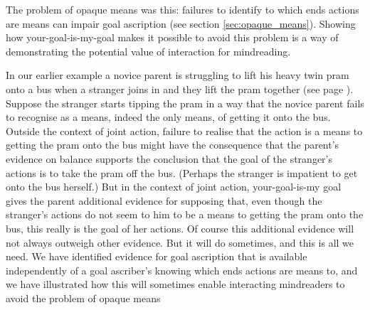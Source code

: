 \documentclass[12pt,\papersize]{extarticle}
\begin{document}
The problem of opaque means was this:
 failures to identify to which ends actions are means can impair goal ascription (see section \vref{sec:opaque_means}).
Showing how your-goal-is-my-goal makes it possible to avoid this problem is a way of demonstrating the potential value   of interaction for mindreading. 

In our earlier example 
a novice parent is struggling to lift his heavy twin pram onto a bus when a stranger joins in and they lift the pram together (see page \pageref*{twin_pram}).
Suppose the stranger starts tipping the pram in a way that the novice parent fails to recognise as a means, indeed the only means, of getting it onto the bus.
Outside the context of joint action, 
failure to realise that the action is a means to getting the pram onto the bus
might have the consequence that
the parent's evidence on balance supports the conclusion that the goal of the stranger's actions is to take the pram off the bus.
(Perhaps the stranger is impatient to get onto the bus herself.)
But in the context of joint action,
your-goal-is-my goal gives the parent  additional evidence for supposing that, 
even though the stranger's actions do not seem to him to be a means to getting the pram onto the bus, 
this really is the goal of her actions.
Of course this additional evidence will not always outweigh   other evidence.
But it will do sometimes, and this is all we need.
We have identified evidence for goal ascription that is available independently of a goal ascriber's knowing which ends actions are means to, and we have illustrated how this will sometimes enable interacting mindreaders to avoid the problem of opaque means
\end{document}
